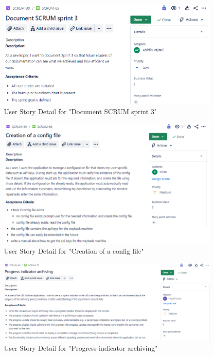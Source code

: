 \begin{figure}[h!]
    \centering
    \includegraphics[width=1\textwidth]{pictures/Scrum/Sprint 4/UserStory_21}
    \caption{User Story Detail for "Document SCRUM sprint 3"}
    \label{fig:sprint_4_userstory_7}
\end{figure}
\begin{figure}[h!]
    \centering
    \includegraphics[width=1\textwidth]{pictures/Scrum/Sprint 4/UserStory_22}
    \caption{User Story Detail for "Creation of a config file"}
    \label{fig:sprint_4_userstory_8}
\end{figure}
\begin{figure}[h!]
    \centering
    \includegraphics[width=1\textwidth]{pictures/Scrum/Sprint 4/UserStory_24}
    \caption{User Story Detail for "Progress indicator archiving"}
    \label{fig:sprint_4_userstory_9}
\end{figure}
